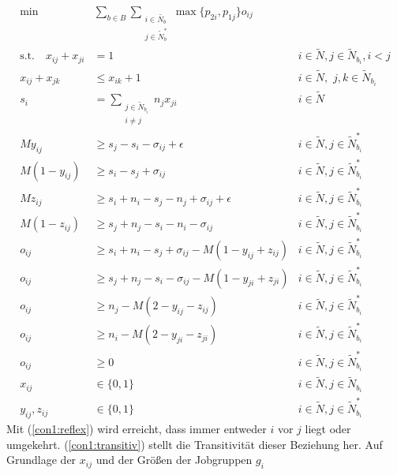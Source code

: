 \documentclass{scrreprt}
\begin{document}
\begin{align}
    \text{min}\quad &\sum_{b\in B}\sum_{\substack{i\in \tilde{N_b}\\j\in \tilde{N}_b^*}} 
            \max\{p_{2i},p_{1j}\}o_{ij} \label{objfunc1}\\
			\text{s.t.} \quad x_{ij} + x_{ji} &= 1 &i\in \tilde{N}, j\in \tilde{N}_{b_i}, i<j \label{con1:reflex}\\
			x_{ij} + x_{jk} &\leq x_{ik} + 1 &i\in \tilde{N},\,\, j,k\in \tilde{N}_{b_i} \label{con1:transitiv} \\
			s_i &= \sum_{\substack{j\in \tilde{N}_{b_i}\\i\neq j}} n_j x_{ji} &i\in \tilde{N} \label{con1:start} \\
            My_{ij} &\geq s_j - s_i - \sigma_{ij} + \epsilon &i\in \tilde{N}, j\in \tilde{N}^*_{b_i} \label{con1:y1} \\
            M(1-y_{ij}) &\geq s_i - s_j + \sigma_{ij} &i\in \tilde{N}, j\in \tilde{N}^*_{b_i} \label{con1:y2} \\
            Mz_{ij} &\geq s_i + n_i - s_j - n_j + \sigma_{ij} + \epsilon &i\in \tilde{N}, j\in \tilde{N}^*_{b_i} \label{con1:z1} \\
            M(1-z_{ij}) &\geq s_j + n_j- s_i - n_i - \sigma_{ij} &i\in \tilde{N}, j\in \tilde{N}^*_{b_i} \label{con1:z2} \\
            o_{ij} &\geq s_i + n_i - s_j + \sigma_{ij} - M(1-y_{ij}+z_{ij}) &i\in \tilde{N}, j\in \tilde{N}^*_{b_i} \label{con1:o1} \\
            o_{ij} &\geq s_j + n_j - s_i - \sigma_{ij} - M(1-y_{ji}+z_{ji}) &i\in \tilde{N}, j\in \tilde{N}^*_{b_i} \label{con1:o2} \\
            o_{ij} &\geq n_j - M(2-y_{ij}-z_{ij}) &i\in \tilde{N}, j\in \tilde{N}^*_{b_i} \label{con1:o3} \\
            o_{ij} &\geq n_i - M(2-y_{ji}-z_{ji}) &i\in \tilde{N}, j\in \tilde{N}^*_{b_i} \label{con1:o4} \\
            o_{ij} &\geq 0 &i\in \tilde{N}, j\in \tilde{N}^*_{b_i} \label{con1:o5} \\
            x_{ij} &\in \{0,1\} &i\in \tilde{N}, j\in \tilde{N}_{b_i} \\
            y_{ij},z_{ij} &\in \{0,1\} &i\in \tilde{N}, j\in \tilde{N}^*_{b_i}
\end{align}
Mit (\ref{con1:reflex}) wird erreicht, dass immer entweder $i$ vor $j$ liegt
oder umgekehrt. (\ref{con1:transitiv}) stellt die Transitivität dieser Beziehung
her. Auf Grundlage der $x_{ij}$ und der Größen der Jobgruppen $g_i$ 
\end{document}

